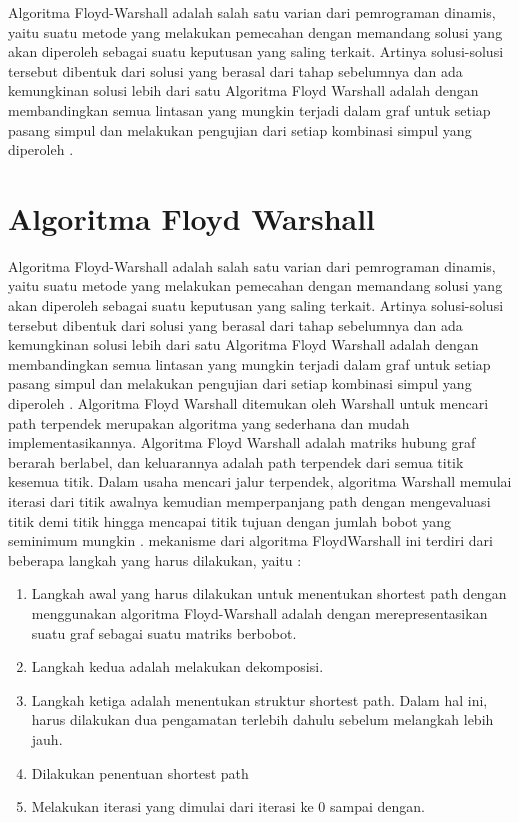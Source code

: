 Algoritma Floyd-Warshall adalah salah satu varian dari pemrograman dinamis, yaitu suatu metode yang melakukan pemecahan dengan memandang solusi yang akan diperoleh sebagai suatu keputusan yang saling terkait. Artinya solusi-solusi tersebut dibentuk dari solusi yang berasal dari tahap sebelumnya dan ada kemungkinan solusi lebih dari satu Algoritma Floyd Warshall adalah dengan membandingkan semua lintasan yang mungkin terjadi dalam graf untuk setiap pasang simpul dan melakukan pengujian dari setiap kombinasi simpul yang diperoleh \cite{novianti2019implementasi}.

\section{Algoritma Floyd Warshall}
Algoritma Floyd-Warshall adalah salah satu varian dari pemrograman dinamis, yaitu suatu metode yang melakukan pemecahan dengan memandang solusi yang akan diperoleh sebagai suatu keputusan yang saling terkait. Artinya solusi-solusi tersebut dibentuk dari solusi yang berasal dari tahap sebelumnya dan ada kemungkinan solusi lebih dari satu Algoritma Floyd Warshall adalah dengan membandingkan semua lintasan yang mungkin terjadi dalam graf untuk setiap pasang simpul dan melakukan pengujian dari setiap kombinasi simpul yang diperoleh \cite{novianti2019implementasi}.
Algoritma Floyd Warshall ditemukan oleh Warshall untuk mencari path terpendek merupakan algoritma yang sederhana dan mudah implementasikannya. Algoritma Floyd Warshall adalah matriks hubung graf berarah berlabel, dan keluarannya adalah path terpendek dari semua titik kesemua titik. Dalam usaha mencari jalur terpendek, algoritma Warshall memulai iterasi dari titik awalnya kemudian memperpanjang path dengan mengevaluasi titik demi titik hingga mencapai titik tujuan dengan jumlah bobot yang seminimum mungkin \cite{hasibuan2016penerapan}.
mekanisme dari algoritma FloydWarshall ini terdiri dari beberapa langkah yang harus dilakukan, yaitu \cite{darnita2017implementasi}:
\begin{enumerate}
    \item Langkah awal yang harus dilakukan untuk menentukan shortest path dengan menggunakan algoritma Floyd-Warshall adalah dengan merepresentasikan suatu graf sebagai suatu matriks berbobot.
    \item Langkah kedua adalah melakukan dekomposisi.
    \item Langkah ketiga adalah menentukan struktur shortest path. Dalam hal ini, harus dilakukan dua pengamatan terlebih dahulu sebelum melangkah lebih jauh.
    \item Dilakukan penentuan shortest path
    \item Melakukan iterasi yang dimulai dari iterasi ke 0 sampai dengan.
\end{enumerate}

